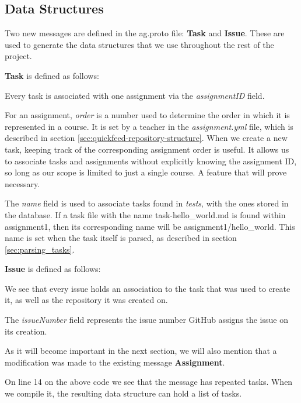 \subsection{Data Structures}

Two new messages are defined in the ag.proto file: \textbf{Task} and \textbf{Issue}.
These are used to generate the data structures that we use throughout the rest of the project.

\textbf{Task} is defined as follows:



Every task is associated with one assignment via the \textit{assignmentID} field.

For an assignment, \textit{order} is a number used to determine the order in which it is represented in a course.
It is set by a teacher in the \textit{assignment.yml} file, which is described in section \ref{sec:quickfeed-repository-structure}.
When we create a new task, keeping track of the corresponding assignment order is useful.
It allows us to associate tasks and assignments without explicitly knowing the assignment ID, so long as our scope is limited to just a single course.
A feature that will prove necessary.

The \textit{name} field is used to associate tasks found in \textit{tests}, with the ones stored in the database.
If a task file with the name task-hello\_world.md is found within assignment1, then its corresponding name will be assignment1/hello\_world.
This name is set when the task itself is parsed, as described in section \ref{sec:parsing_tasks}.

\textbf{Issue} is defined as follows:



We see that every issue holds an association to the task that was used to create it, as well as the repository it was created on.

The \textit{issueNumber} field represents the issue number GitHub assigns the issue on its creation.

As it will become important in the next section, we will also mention that a modification was made to the existing message \textbf{Assignment}.



On line 14 on the above code we see that the message has repeated tasks.
When we compile it, the resulting data structure can hold a list of tasks.

